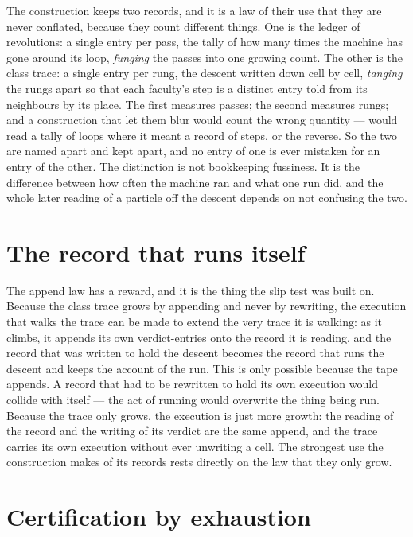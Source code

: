 The construction keeps two records, and it is a law of their use that they are never conflated, because they
count different things. One is the ledger of revolutions: a single entry per pass, the tally of how many
times the machine has gone around its loop, \emph{funging} the passes into one growing count. The other is
the class trace: a single entry per rung, the descent written down cell by cell, \emph{tanging} the rungs
apart so that each faculty's step is a distinct entry told from its neighbours by its place. The first
measures passes; the second measures rungs; and a construction that let them blur would count the wrong
quantity --- would read a tally of loops where it meant a record of steps, or the reverse. So the two are
named apart and kept apart, and no entry of one is ever mistaken for an entry of the other. The distinction
is not bookkeeping fussiness. It is the difference between how often the machine ran and what one run did,
and the whole later reading of a particle off the descent depends on not confusing the two.

\section{The record that runs itself}
\label{se:the-record-that-runs-itself}

The append law has a reward, and it is the thing the slip test was built on. Because the class trace grows
by appending and never by rewriting, the execution that walks the trace can be made to extend the very
trace it is walking: as it climbs, it appends its own verdict-entries onto the record it is reading, and the
record that was written to hold the descent becomes the record that runs the descent and keeps the account
of the run. This is only possible because the tape appends. A record that had to be rewritten to hold its
own execution would collide with itself --- the act of running would overwrite the thing being run. Because
the trace only grows, the execution is just more growth: the reading of the record and the writing of its
verdict are the same append, and the trace carries its own execution without ever unwriting a cell. The
strongest use the construction makes of its records rests directly on the law that they only grow.

\section{Certification by exhaustion}
\label{se:certification-by-exhaustion}

